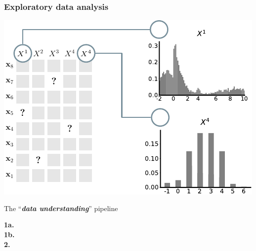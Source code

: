\documentclass[xcolor={usenames,dvipsnames,svgnames}, compress, aspectratio=169, 11pt]{beamer}
\begin{document}
\begin{frame}[t, htt=bgrey2]
  \frametitle{Exploratory data analysis}

  \large
  \begin{minipage}[t]{0.6\linewidth}
    \vspace{5pt}
    \includegraphics[width=.9\linewidth]{figures/abda-miss-hist-type}
  \end{minipage}\hfill\begin{minipage}[t]{0.4\linewidth}
    \vspace{10pt}
    {The ``\emph{\textbf{data understanding}}'' pipeline}\\[3pt]
    \raggedleft\begin{minipage}[t]{.9\linewidth}
      {\textbf{1a.} \\[-2pt]}
      {\textbf{1b.}\hspace{0pt} \\[-2pt]}
      {\textbf{2.}\hspace{6pt} \\[-2pt]}
    
    \end{minipage}    
  \end{minipage}  
\end{frame}
\end{document}
